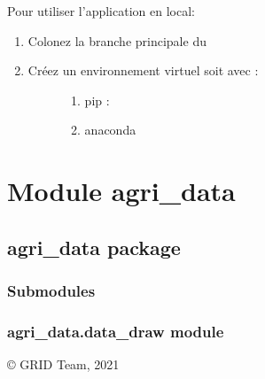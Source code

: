 \documentclass[letterpaper,10pt,french]{sphinxmanual}
\begin{document}
\sphinxAtStartPar
Pour utiliser l’application en local:
\begin{enumerate}
%
\item {} 
\sphinxAtStartPar
Colonez la branche principale du 

\item {} \begin{description}
\item[{Créez un environnement virtuel soit avec :}] \leavevmode\begin{enumerate}
%
\item {} 
\sphinxAtStartPar
pip : 

\item {} 
\sphinxAtStartPar
anaconda 

\end{enumerate}

\end{description}

\end{enumerate}


\section{Module agri\_data}
\label{\detokenize{modules:module-agri-data}}\label{\detokenize{modules:agri}}\label{\detokenize{modules::doc}}

\subsection{agri\_data package}
\label{\detokenize{agri_data:agri-data-package}}\label{\detokenize{agri_data::doc}}

\subsubsection{Submodules}
\label{\detokenize{agri_data:submodules}}

\subsubsection{agri\_data.data\_draw module}
\label{\detokenize{agri_data:module-agri_data.data_draw}}\label{\detokenize{agri_data:agri-data-data-draw-module}}
\sphinxAtStartPar
© GRID Team, 2021
\end{document}
